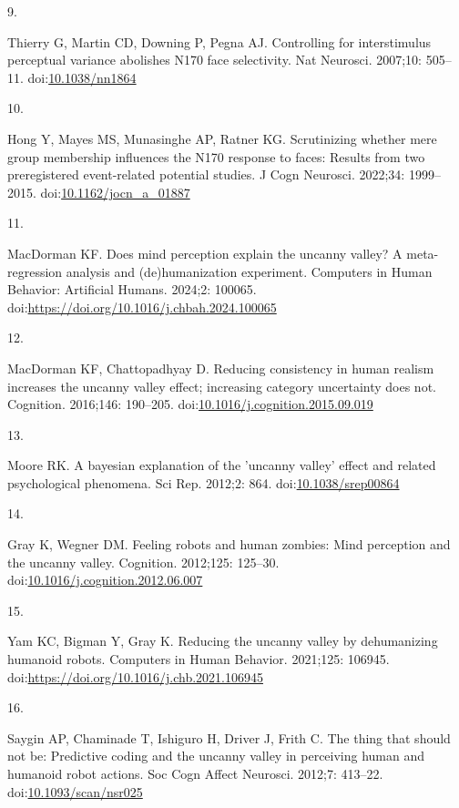 \documentclass[
]{article}
\newlength{\cslhangindent}
\newlength{\csllabelwidth}
\newenvironment{CSLReferences}[2] %
 {\begin{list}{}{%
  \setlength{\itemindent}{0pt}
  \setlength{\leftmargin}{0pt}
  \setlength{\parsep}{0pt}
  \ifodd #1
   \setlength{\leftmargin}{\cslhangindent}
   \setlength{\itemindent}{-1\cslhangindent}
  \fi
  \setlength{\itemsep}{#2\baselineskip}}}
 {\end{list}}
\newcommand{\CSLLeftMargin}[1]{\parbox[t]{\csllabelwidth}{\strut#1\strut}}
\newcommand{\CSLRightInline}[1]{\parbox[t]{\linewidth - \csllabelwidth}{\strut#1\strut}}
\begin{document}
\begin{CSLReferences}{0}{1}
\CSLLeftMargin{9. }%
\CSLRightInline{Thierry G, Martin CD, Downing P, Pegna AJ. Controlling for interstimulus perceptual variance abolishes N170 face selectivity. Nat Neurosci. 2007;10: 505--11. doi:\href{https://doi.org/10.1038/nn1864}{10.1038/nn1864}}

\CSLLeftMargin{10. }%
\CSLRightInline{Hong Y, Mayes MS, Munasinghe AP, Ratner KG. Scrutinizing whether mere group membership influences the N170 response to faces: Results from two preregistered event-related potential studies. J Cogn Neurosci. 2022;34: 1999--2015. doi:\href{https://doi.org/10.1162/jocn_a_01887}{10.1162/jocn\_a\_01887}}

\CSLLeftMargin{11. }%
\CSLRightInline{MacDorman KF. Does mind perception explain the uncanny valley? A meta-regression analysis and (de)humanization experiment. Computers in Human Behavior: Artificial Humans. 2024;2: 100065. doi:\url{https://doi.org/10.1016/j.chbah.2024.100065}}

\CSLLeftMargin{12. }%
\CSLRightInline{MacDorman KF, Chattopadhyay D. Reducing consistency in human realism increases the uncanny valley effect; increasing category uncertainty does not. Cognition. 2016;146: 190--205. doi:\href{https://doi.org/10.1016/j.cognition.2015.09.019}{10.1016/j.cognition.2015.09.019}}

\CSLLeftMargin{13. }%
\CSLRightInline{Moore RK. A bayesian explanation of the 'uncanny valley' effect and related psychological phenomena. Sci Rep. 2012;2: 864. doi:\href{https://doi.org/10.1038/srep00864}{10.1038/srep00864}}

\CSLLeftMargin{14. }%
\CSLRightInline{Gray K, Wegner DM. Feeling robots and human zombies: Mind perception and the uncanny valley. Cognition. 2012;125: 125--30. doi:\href{https://doi.org/10.1016/j.cognition.2012.06.007}{10.1016/j.cognition.2012.06.007}}

\CSLLeftMargin{15. }%
\CSLRightInline{Yam KC, Bigman Y, Gray K. Reducing the uncanny valley by dehumanizing humanoid robots. Computers in Human Behavior. 2021;125: 106945. doi:\url{https://doi.org/10.1016/j.chb.2021.106945}}

\CSLLeftMargin{16. }%
\CSLRightInline{Saygin AP, Chaminade T, Ishiguro H, Driver J, Frith C. The thing that should not be: Predictive coding and the uncanny valley in perceiving human and humanoid robot actions. Soc Cogn Affect Neurosci. 2012;7: 413--22. doi:\href{https://doi.org/10.1093/scan/nsr025}{10.1093/scan/nsr025}}


\end{CSLReferences}
\end{document}
